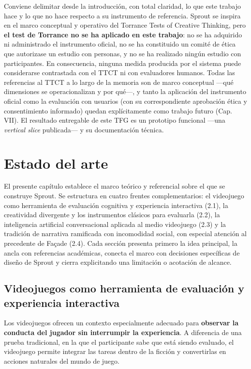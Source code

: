 \documentclass[12pt,twoside,titlepage]{report}
\begin{document}
Conviene delimitar desde la introducción, con total claridad, lo que este trabajo hace y lo que no hace respecto a su instrumento de referencia. Sprout se inspira en el marco conceptual y operativo del Torrance Tests of Creative Thinking, pero \textbf{el test de Torrance no se ha aplicado en este trabajo}: no se ha adquirido ni administrado el instrumento oficial, no se ha constituido un comité de ética que autorizase un estudio con personas, y no se ha realizado ningún estudio con participantes. En consecuencia, ninguna medida producida por el sistema puede considerarse contrastada con el TTCT ni con evaluadores humanos. Todas las referencias al TTCT a lo largo de la memoria son de marco conceptual ---qué dimensiones se operacionalizan y por qué---, y tanto la aplicación del instrumento oficial como la evaluación con usuarios (con su correspondiente aprobación ética y consentimiento informado) quedan explícitamente como trabajo futuro (Cap. VII). El resultado entregable de este TFG es un prototipo funcional ---una \textit{vertical slice} publicada--- y su documentación técnica.

\chapter{Estado del arte}

El presente capítulo establece el marco teórico y referencial sobre el que se construye Sprout. Se estructura en cuatro frentes complementarios: el videojuego como herramienta de evaluación cognitiva y experiencia interactiva (2.1), la creatividad divergente y los instrumentos clásicos para evaluarla (2.2), la inteligencia artificial conversacional aplicada al medio videojuego (2.3) y la tradición de narrativa ramificada con incomodidad social, con especial atención al precedente de Façade (2.4). Cada sección presenta primero la idea principal, la ancla con referencias académicas, conecta el marco con decisiones específicas de diseño de Sprout y cierra explicitando una limitación o acotación de alcance.

\section{Videojuegos como herramienta de evaluación y experiencia interactiva}

Los videojuegos ofrecen un contexto especialmente adecuado para \textbf{observar la conducta del jugador sin interrumpir la experiencia}. A diferencia de una prueba tradicional, en la que el participante sabe que está siendo evaluado, el videojuego permite integrar las tareas dentro de la ficción y convertirlas en acciones naturales del mundo de juego.
\end{document}
